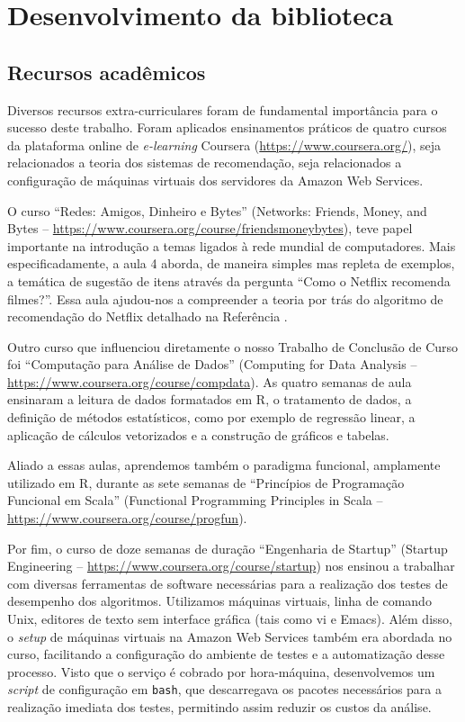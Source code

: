 \chapter{Desenvolvimento da biblioteca} %
\label{cha:desenvolvimento_da_biblioteca}

\section{Recursos acadêmicos} %
\label{sec:recursos_acad_micos}

Diversos recursos extra-curriculares foram de fundamental importância para o sucesso deste trabalho. Foram aplicados ensinamentos práticos de quatro cursos da plataforma online de \textit{e-learning} Coursera (\url{https://www.coursera.org/}), seja relacionados a teoria dos sistemas de recomendação, seja relacionados a configuração de máquinas virtuais dos servidores da Amazon Web Services.

O curso ``Redes: Amigos, Dinheiro e Bytes'' (Networks: Friends, Money, and Bytes -- \url{https://www.coursera.org/course/friendsmoneybytes}), teve papel importante na introdução a temas ligados à rede mundial de computadores. Mais especificadamente, a aula 4 aborda, de maneira simples mas repleta de exemplos, a temática de sugestão de itens através da pergunta ``Como o Netflix recomenda filmes?''. Essa aula ajudou-nos a compreender a teoria por trás do algoritmo de recomendação do Netflix detalhado na Referência .


Outro curso que influenciou diretamente o nosso Trabalho de Conclusão de Curso foi ``Computação para Análise de Dados'' (Computing for Data Analysis -- \url{https://www.coursera.org/course/compdata}). As quatro semanas de aula ensinaram a leitura de dados formatados em R, o tratamento de dados, a definição de métodos estatísticos, como por exemplo de regressão linear, a aplicação de cálculos vetorizados e a construção de gráficos e tabelas. 

Aliado a essas aulas, aprendemos também o paradigma funcional, amplamente utilizado em R, durante as sete semanas de ``Princípios de Programação Funcional em Scala'' (Functional Programming Principles in Scala -- \url{https://www.coursera.org/course/progfun}).

Por fim, o curso de doze semanas de duração ``Engenharia de Startup'' (Startup Engineering -- \url{https://www.coursera.org/course/startup}) nos ensinou a trabalhar com diversas ferramentas de software necessárias para a realização dos testes de desempenho dos algoritmos. Utilizamos máquinas virtuais, linha de comando Unix, editores de texto sem interface gráfica (tais como vi e Emacs). Além disso, o \textit{setup} de máquinas virtuais na Amazon Web Services também era abordada no curso, facilitando a configuração do ambiente de testes e a automatização desse processo. Visto que o serviço é cobrado por hora-máquina, desenvolvemos um \textit{script} de configuração em \texttt{bash}, que descarregava os pacotes necessários para a realização imediata dos testes, permitindo assim reduzir os custos da análise.   

